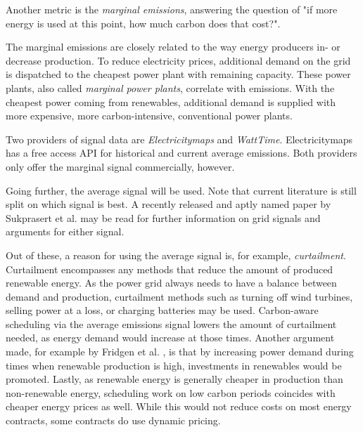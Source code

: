 Another metric is the \emph{marginal emissions}, answering the question of "if more energy is used at this point, how much carbon does that cost?".

The marginal emissions are closely related to the way energy producers in- or decrease production.
To reduce electricity prices, additional demand on the grid is dispatched to the cheapest power plant with remaining capacity. 
These power plants, also called \emph{marginal power plants}, correlate with emissions.
With the cheapest power coming from renewables, additional demand is supplied with more expensive, more carbon-intensive, conventional power plants.

Two providers of signal data are \emph{Electricitymaps} and \emph{WattTime}.
Electricitymaps has a free access API for historical and current average emissions. Both providers only offer the marginal signal commercially, however. 

Going further, the average signal will be used. 
Note that current literature is still split on which signal is best. 
A recently released and aptly named paper by Sukprasert et al. \cite{sukprasert_limitations_2024} may be read for further information on grid signals and arguments for either signal.

Out of these, a reason for using the average signal is, for example, \emph{curtailment}. 
Curtailment encompasses any methods that reduce the amount of produced renewable energy. As the power grid always needs to have a balance between demand and production, curtailment methods such as turning off wind turbines, selling power at a loss, or charging batteries may be used. 
Carbon-aware scheduling via the average emissions signal lowers the amount of curtailment needed, as energy demand would increase at those times.
Another argument made, for example by Fridgen et al. \cite{fridgen_not_2021}, is that by increasing power demand during times when renewable production is high, investments in renewables would be promoted. 
Lastly, as renewable energy is generally cheaper in production than non-renewable energy, scheduling work on low carbon periods coincides with cheaper energy prices as well. While this would not reduce costs on most energy contracts, some contracts do use dynamic pricing.

